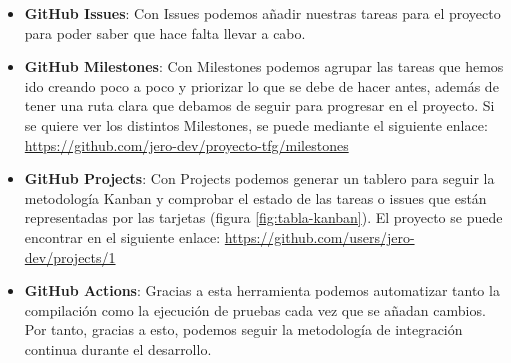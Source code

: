 \begin{itemize}
    \item \textbf{GitHub Issues}: Con Issues podemos añadir nuestras tareas para el 
    proyecto para poder saber que hace falta llevar a cabo.
    \item \textbf{GitHub Milestones}: Con Milestones podemos agrupar las tareas que 
    hemos ido creando poco a poco y priorizar lo que se debe de hacer antes, además 
    de tener una ruta clara que debamos de seguir para progresar en el proyecto. 
    Si se quiere ver los distintos Milestones, se puede mediante el siguiente 
    enlace: \url{https://github.com/jero-dev/proyecto-tfg/milestones}
    \item \textbf{GitHub Projects}: Con Projects podemos generar un tablero para 
    seguir la metodología Kanban y comprobar el estado de las tareas o issues que 
    están representadas por las tarjetas (figura \ref{fig:tabla-kanban}). El 
    proyecto se puede encontrar en el siguiente enlace: 
    \url{https://github.com/users/jero-dev/projects/1}
    \item \textbf{GitHub Actions}: Gracias a esta herramienta podemos automatizar 
    tanto la compilación como la ejecución de pruebas cada vez que se añadan 
    cambios. Por tanto, gracias a esto, podemos seguir la metodología de 
    integración continua durante el desarrollo.
\end{itemize}
